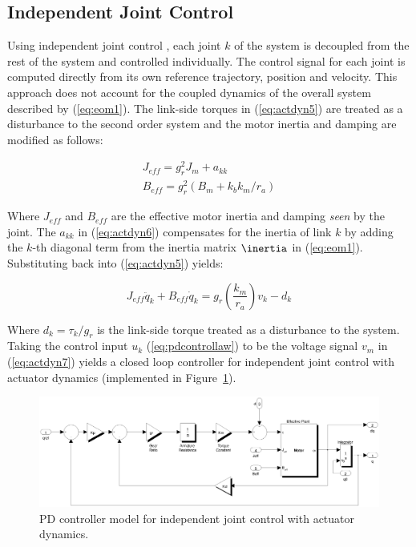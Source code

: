 \subsection{Independent Joint Control} %
\label{sub:independent_joint_control}


Using independent joint control \cite{Sciavicco2001}, each joint $k$ of the system is decoupled from the rest of the system and controlled individually. The control signal for each joint is computed directly from its own reference trajectory, position and velocity. This approach does not account for the coupled dynamics of the overall system described by (\ref{eq:eom1}). The link-side torques in (\ref{eq:actdyn5}) are treated as a disturbance to the second order system and the motor inertia and damping are modified as follows: 

\begin{equation}
	\begin{array}{l}
		{J_{eff}} = g_r^2{J_m} + {a_{kk}}\\
		{B_{eff}} = g_r^2({B_m} + {k_b}{k_m}/{r_a})
	\end{array}
	\label{eq:actdyn6}
\end{equation}

Where ${J_{eff}}$ and ${B_{eff}}$ are the effective motor inertia and damping \emph{seen} by the joint. The ${a_{kk}}$ in (\ref{eq:actdyn6}) compensates for the inertia of link $k$ by adding the $k$-th diagonal term from the inertia matrix $\inertia$ in (\ref{eq:eom1}). Substituting back into (\ref{eq:actdyn5}) yields: 

\begin{equation}
	{J_{eff}}{\ddot q_k} + {B_{eff}}{\dot q_k} = g_r^{}\left( {\frac{{{k_m}}}{{{r_a}}}} \right){v_k} - {d_k}
	\label{eq:actdyn7}
\end{equation}

Where ${d_k} = \tau _k / g _r$ is the link-side torque treated as a disturbance to the system. Taking the control input $u _k$ (\ref{eq:pdcontrollaw}) to be the voltage signal $v _m$ in (\ref{eq:actdyn7}) yields a closed loop controller for independent joint control with actuator dynamics (implemented in Figure~\ref{fig:pdmotorcontroller}).

\begin{figure}[!b]
	\centering
    \includegraphics[scale=0.5]{fig/experiments/pdmotorcontroller.eps} 
  	\caption{PD controller model for independent joint control with actuator dynamics.}
	\label{fig:pdmotorcontroller}
\end{figure}

